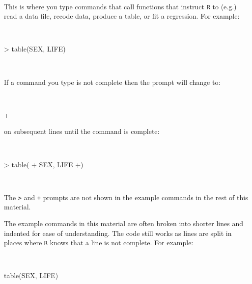 \documentclass[
  12pt,
  a4paper]{book}
\newenvironment{Shaded}{\begin{snugshade}}{\end{snugshade}}
\newcommand{\FunctionTok}[1]{\textcolor[rgb]{0.00,0.00,0.00}{#1}}
\newcommand{\NormalTok}[1]{#1}
\newcommand{\SpecialCharTok}[1]{\textcolor[rgb]{0.00,0.00,0.00}{#1}}
\begin{document}
~

This is where you type commands that call functions that instruct \texttt{R} to (e.g.) read a data file, recode data, produce a table, or fit a regression. For example:

~

\begin{Shaded}
\begin{Highlighting}[]
\SpecialCharTok{\textgreater{}} \FunctionTok{table}\NormalTok{(SEX, LIFE)}
\end{Highlighting}
\end{Shaded}

~

If a command you type is not complete then the prompt will change to:

~

\begin{Shaded}
\begin{Highlighting}[]
\SpecialCharTok{+}
\end{Highlighting}
\end{Shaded}

\newpage

on subsequent lines until the command is complete:

~

\begin{Shaded}
\begin{Highlighting}[]
\SpecialCharTok{\textgreater{}} \FunctionTok{table}\NormalTok{(}
\SpecialCharTok{+}\NormalTok{ SEX, LIFE }\SpecialCharTok{+}\NormalTok{)}
\end{Highlighting}
\end{Shaded}

~

The \texttt{\textgreater{}} and \texttt{+} prompts are not shown in the example commands in the rest of this material.

The example commands in this material are often broken into shorter lines and indented for ease of understanding. The code still works as lines are split in places where \texttt{R} knows that a line is not complete. For example:

~

\begin{Shaded}
\begin{Highlighting}[]
\FunctionTok{table}\NormalTok{(SEX,}
\NormalTok{      LIFE)}
\end{Highlighting}
\end{Shaded}

~
\end{document}
